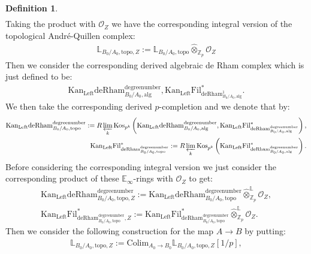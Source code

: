 \documentclass[11pt]{book}
\theoremstyle{definition}
\newtheorem{definition}[theorem]{Definition}
\numberwithin{equation}{section}
\begin{document}
\begin{definition}
\begin{align}
\end{align}
Taking the product with $\mathcal{O}_Z$ we have the corresponding integral version of the topological Andr\'e-Quillen complex:
\begin{align}
\mathbb{L}_{B_0/A_0,\mathrm{topo},Z}:=\mathbb{L}_{B_0/A_0,\mathrm{topo}}\widehat{\otimes}_{\mathbb{Z}_p}\mathcal{O}_Z
\end{align}
Then we consider the corresponding derived algebraic de Rham complex which is just defined to be:
\begin{align}
\mathrm{Kan}_\mathrm{Left}\mathrm{deRham}^\text{degreenumber}_{B_0/A_0,\mathrm{alg}},\mathrm{Kan}_\mathrm{Left}\mathrm{Fil}^*_{\mathrm{deRham}^1_{B_0/A_0,\mathrm{alg}}}.	
\end{align}
We then take the corresponding derived $p$-completion and we denote that by:
\begin{align}
\mathrm{Kan}_\mathrm{Left}\mathrm{deRham}^\text{degreenumber}_{B_0/A_0,\mathrm{topo}}:=R\varprojlim_k\mathrm{Kos}_{p^k}\left(\mathrm{Kan}_\mathrm{Left}\mathrm{deRham}^\text{degreenumber}_{B_0/A_0,\mathrm{alg}},\mathrm{Kan}_\mathrm{Left}\mathrm{Fil}^*_{\mathrm{deRham}^\text{degreenumber}_{B_0/A_0,\mathrm{alg}}}\right),\\
\mathrm{Kan}_\mathrm{Left}\mathrm{Fil}^*_{\mathrm{deRham}^\text{degreenumber}_{B_0/A_0,\mathrm{topo}}}:=R\varprojlim_k\mathrm{Kos}_{p^k}\left(\mathrm{Kan}_\mathrm{Left}\mathrm{Fil}^*_{\mathrm{deRham}^\text{degreenumber}_{B_0/A_0,\mathrm{alg}}}\right).	
\end{align}
Before considering the corresponding integral version we just consider the corresponding product of these $\mathbb{E}_\infty$-rings with $\mathcal{O}_Z$ to get:
\begin{align}
\mathrm{Kan}_\mathrm{Left}\mathrm{deRham}^\text{degreenumber}_{B_0/A_0,\mathrm{topo},Z}:=\mathrm{Kan}_\mathrm{Left}\mathrm{deRham}^\text{degreenumber}_{B_0/A_0,\mathrm{topo}}\widehat{\otimes}^\mathbb{L}_{\mathbb{Z}_p}\mathcal{O}_Z,\\
\mathrm{Kan}_\mathrm{Left}\mathrm{Fil}^*_{\mathrm{deRham}^\text{degreenumber}_{B_0/A_0,\mathrm{topo}},Z}:=\mathrm{Kan}_\mathrm{Left}\mathrm{Fil}^*_{\mathrm{deRham}^\text{degreenumber}_{B_0/A_0,\mathrm{topo}}}\widehat{\otimes}^\mathbb{L}_{\mathbb{Z}_p}\mathcal{O}_Z.	
\end{align}
Then we consider the following construction for the map $A\rightarrow B$ by putting:
\begin{align}
\mathbb{L}_{B_0/A_0,\mathrm{topo},Z}:= \mathrm{Colim}_{A_0\rightarrow B_0}\mathbb{L}_{B_0/A_0,\mathrm{topo},Z}[1/p],\\

\end{align}
\end{definition}
\end{document}

